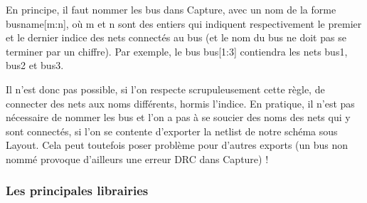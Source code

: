 \documentclass[a4paper]{article}
\begin{document}
En principe, il faut nommer les bus dans Capture, avec un nom de la forme \og{}busname[m:n]\fg{}, où m et n sont des entiers qui indiquent respectivement le premier et le dernier indice des nets connectés au bus (et le nom du bus ne doit pas se terminer par un chiffre). Par exemple, le bus \og{}bus[1:3]\fg{} contiendra les nets \og{}bus1\fg{}, \og{}bus2\fg{} et \og{}bus3\fg{}.

Il n'est donc pas possible, si l'on respecte scrupuleusement cette règle, de connecter des nets aux noms différents, hormis l'indice. En pratique, il n'est pas nécessaire de nommer les bus et l'on a pas à se soucier des noms des nets qui y sont connectés, si l'on se contente d'exporter la netlist de notre schéma sous Layout. Cela peut toutefois poser problème pour d'autres exports (un bus non nommé provoque d'ailleurs une erreur \ac{DRC} dans Capture) !

\subsubsection{Les principales librairies}
\end{document}
